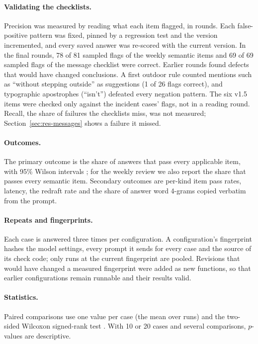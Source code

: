 \documentclass[10pt,twocolumn]{article}
\begin{document}
\paragraph{Validating the checklists.} Precision was measured by reading what each item flagged, in rounds. Each
false-positive pattern was fixed, pinned by a regression test and the version incremented, and every saved answer
was re-scored with the current version. In the final rounds, 78 of 81 sampled flags of the weekly semantic items and
69 of 69 sampled flags of the message checklist were correct. Earlier rounds found defects that would have changed
conclusions. A first outdoor rule counted mentions such as ``without stepping outside'' as suggestions (1 of 26 flags
correct), and typographic apostrophes (``isn\textquoteright{}t'') defeated every negation pattern. The six v1.5 items were checked only against the incident cases' flags, not in a reading round. Recall, the share of
failures the checklists miss, was not measured; Section~\ref{sec:res-messages} shows a failure it missed.

\paragraph{Outcomes.} The primary outcome is the share of answers that pass every applicable item, with 95\% Wilson
intervals \citep{wilson1927probable}; for the weekly review we also report the share that passes every semantic item.
Secondary outcomes are per-kind item pass rates, latency, the redraft rate and the share of answer word 4-grams copied
verbatim from the prompt.

\paragraph{Repeats and fingerprints.} Each case is answered three times per configuration. A configuration's
fingerprint hashes the model settings, every prompt it sends for every case and the source of its check code; only
runs at the current fingerprint are pooled. Revisions that would have changed a measured fingerprint were added as new
functions, so that earlier configurations remain runnable and their results valid.

\paragraph{Statistics.} Paired comparisons use one value per case (the mean over runs) and the two-sided Wilcoxon
signed-rank test \citep{wilcoxon1945individual}. With 10 or 20 cases and several comparisons, $p$-values are
descriptive.
\end{document}
